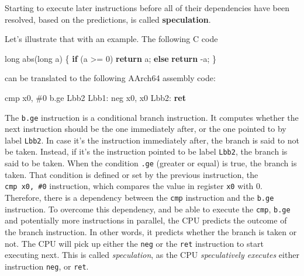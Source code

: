 \documentclass[
  a4paper,
]{report}
\newenvironment{Shaded}{}{}
\newcommand{\BuiltInTok}[1]{\textcolor[rgb]{0.00,0.50,0.00}{#1}}
\newcommand{\ControlFlowTok}[1]{\textcolor[rgb]{0.00,0.44,0.13}{\textbf{#1}}}
\newcommand{\DataTypeTok}[1]{\textcolor[rgb]{0.56,0.13,0.00}{#1}}
\newcommand{\DecValTok}[1]{\textcolor[rgb]{0.25,0.63,0.44}{#1}}
\newcommand{\FunctionTok}[1]{\textcolor[rgb]{0.02,0.16,0.49}{#1}}
\newcommand{\NormalTok}[1]{#1}
\newcommand{\OperatorTok}[1]{\textcolor[rgb]{0.40,0.40,0.40}{#1}}
\begin{document}
Starting to execute later instructions before all of their dependencies
have been resolved, based on the predictions, is called
\textbf{\label{__index_entry_169}{speculation}}.

Let's illustrate that with an example. The following C code

\begin{Shaded}
\begin{Highlighting}[]
\DataTypeTok{long}\NormalTok{ abs}\OperatorTok{(}\DataTypeTok{long}\NormalTok{ a}\OperatorTok{)} \OperatorTok{\{}
  \ControlFlowTok{if} \OperatorTok{(}\NormalTok{a }\OperatorTok{\textgreater{}=} \DecValTok{0}\OperatorTok{)}
    \ControlFlowTok{return}\NormalTok{ a}\OperatorTok{;}
  \ControlFlowTok{else}
    \ControlFlowTok{return} \OperatorTok{{-}}\NormalTok{a}\OperatorTok{;}
\OperatorTok{\}}
\end{Highlighting}
\end{Shaded}

can be translated to the following AArch64 assembly code:

\begin{Shaded}
\begin{Highlighting}[]
        \BuiltInTok{cmp}\NormalTok{     x0}\OperatorTok{,} \OperatorTok{\#}\DecValTok{0}
\NormalTok{        b}\OperatorTok{.}\NormalTok{ge    Lbb2}
\FunctionTok{Lbb1:}
        \BuiltInTok{neg}\NormalTok{     x0}\OperatorTok{,}\NormalTok{ x0}
\FunctionTok{Lbb2:}
        \ControlFlowTok{ret}
\end{Highlighting}
\end{Shaded}

The \texttt{b.ge} instruction is a conditional branch instruction. It
computes whether the next instruction should be the one immediately
after, or the one pointed to by label \texttt{Lbb2}. In case it's the
instruction immediately after, the branch is said to not be taken.
Instead, if it's the instruction pointed to be label \texttt{Lbb2}, the
branch is said to be taken. When the condition \texttt{.ge} (greater or
equal) is true, the branch is taken. That condition is defined or set by
the previous instruction, the \texttt{cmp\ x0,\ \#0} instruction, which
compares the value in register \texttt{x0} with 0. Therefore, there is a
dependency between the \texttt{cmp} instruction and the \texttt{b.ge}
instruction. To overcome this dependency, and be able to execute the
\texttt{cmp}, \texttt{b.ge} and potentially more instructions in
parallel, the CPU predicts the outcome of the branch instruction. In
other words, it predicts whether the branch is taken or not. The CPU
will pick up either the \texttt{neg} or the \texttt{ret} instruction to
start executing next. This is called \emph{speculation}, as the CPU
\emph{speculatively executes} either instruction \texttt{neg}, or
\texttt{ret}.
\end{document}
